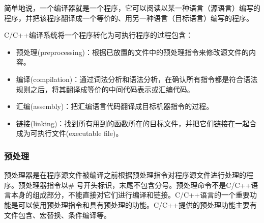 简单地说，一个编译器就是一个程序，它可以阅读以某一种语言（源语言）编写的程序，并把该程序翻译成一个等价的、用另一种语言（目标语言）编写的程序。

C/C++编译系统将一个程序转化为可执行程序的过程包含：

\begin{itemize}
\item 预处理(preprocessing)：根据已放置的文件中的预处理指令来修改源文件的内容。
\item 编译(compilation)：通过词法分析和语法分析，在确认所有指令都是符合语法规则之后，将其翻译成等价的中间代码表示或汇编代码。
\item 汇编(assembly)：把汇编语言代码翻译成目标机器指令的过程。
\item 链接(linking)：找到所有用到的函数所在的目标文件，并把它们链接在一起合成为可执行文件(executable file)。
\end{itemize}


\subsubsection{预处理} 

预处理器是在程序源文件被编译之前根据预处理指令对程序源文件进行处理的程序。预处理器指令以\# 号开头标识，末尾不包含分号。预处理命令不是C/C++语言本身的组成部分，不能直接对它们进行编译和链接。C/C++语言的一个重要功能是可以使用预处理指令和具有预处理的功能。C/C++提供的预处理功能主要有文件包含、宏替换、条件编译等。

